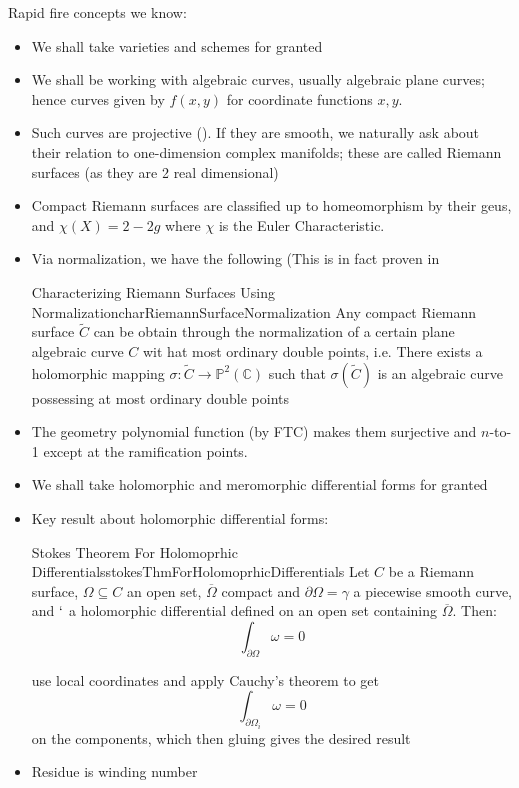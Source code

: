 \documentclass{book}
\newcommand{\C}{{\mathbb{C}}}
\renewcommand{\P}{{\mathbb{P}}}
\newcommand{\sse}{\subseteq}
\begin{document}
Rapid fire concepts we know:
\begin{itemize}
  \item We shall take varieties and schemes for granted
  \item We shall be working with algebraic curves, usually algebraic plane curves; hence curves given by
    $f(x,y)$ for coordinate functions $x,y$.
 \item Such curves are projective (\cite{NateAlgGeo}). If they are smooth, we naturally ask about their
   relation to one-dimension complex manifolds; these are called Riemann surfaces (as they are 2 real
   dimensional)
  \item Compact Riemann surfaces are classified up to homeomorphism by their geus, and $\chi(X) = 2-2g$
    where $\chi$ is the Euler Characteristic.
  \item Via normalization, we have the following (This is in fact proven in \cite{a.griffithsIntroductionAlgebraicCurves}
    \begin{thm}{Characterizing Riemann Surfaces Using Normalization}{charRiemannSurfaceNormalization}
      Any compact Riemann surface $\tilde{C}$ can be obtain through the normalization of a certain plane
      algebraic curve $C$ wit hat most ordinary double points, i.e. There exists a holomorphic mapping
      $\sigma: \tilde{C} \to \P^2(\C)$ such that $\sigma(\tilde{C})$ is an algebraic curve possessing at
      most ordinary double points
    \end{thm}
   \item The geometry polynomial function (by FTC) makes them surjective and $n$-to-1 except at the
     ramification points.
  \item We shall take holomorphic and meromorphic differential forms for granted
  \item Key result about holomorphic differential forms:
    \begin{thm}{Stokes Theorem For Holomoprhic Differentials}{stokesThmForHolomoprhicDifferentials}
      Let $C$ be a Riemann surface, $\Omega \sse C$ an open set, $\overline{\Omega}$ compact and $\partial
      \Omega = \gamma$ a piecewise smooth curve, and $`$ a holomorphic differential defined on an open set
      containing $\overline{\Omega}$. Then:
      \[
        \int_{\partial \Omega}\omega = 0
      \]
    \end{thm}

    \begin{Proof}
      use local coordinates and apply Cauchy's theorem to get
      \[
        \int_{\partial \Omega_i} \omega = 0
      \]
      on the components, which then gluing gives the desired result
    \end{Proof}
  \item Residue is winding number
\end{itemize}
\end{document}
